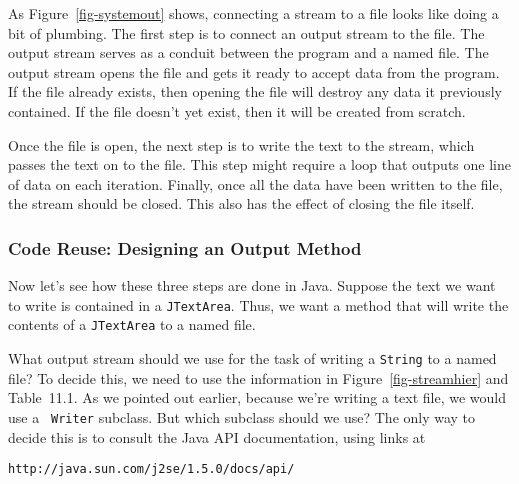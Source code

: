 \noindent As Figure~\ref{fig-systemout} shows, connecting
a stream to a file looks like doing a bit of plumbing.   The first step is
to connect an output stream to the file.   The output stream serves as
a conduit between the program and a named file.  The output stream
opens the file and gets it ready to accept data from the program.  If
the file already exists, then opening the file will destroy any data
it previously contained.  If the file doesn't yet exist, then it will
be created from scratch.

Once the file is open, the next step is to write the text to the
stream, which passes the text on to the file.   This step might require a loop
that outputs one line of data on each iteration.  Finally, once all
the data have been written to the file, the stream should be closed.
This also has the effect of closing the file itself.


\subsubsection*{Code Reuse: Designing an Output Method}
\noindent Now let's see how these three steps are done in Java.  Suppose the text
we want to write is contained in a {\tt JTextArea}. Thus, we want a
method that will write the contents of a {\tt JTextArea} to a named
file.

What output stream should we use for the task of writing a {\tt String}
to a named file? To decide this, we need to use the information in
Figure~\ref{fig-streamhier} and Table~11.1. As we pointed
out earlier, because we're writing a text file, we would use a {\tt
Writer} subclass.  But which subclass should we use? The only way to
decide this is to consult the Java API documentation, using links at

\begin{jjjlisting}
\begin{lstlisting}[commentstyle=\color{black}]
http://java.sun.com/j2se/1.5.0/docs/api/
\end{lstlisting}
\end{jjjlisting}

